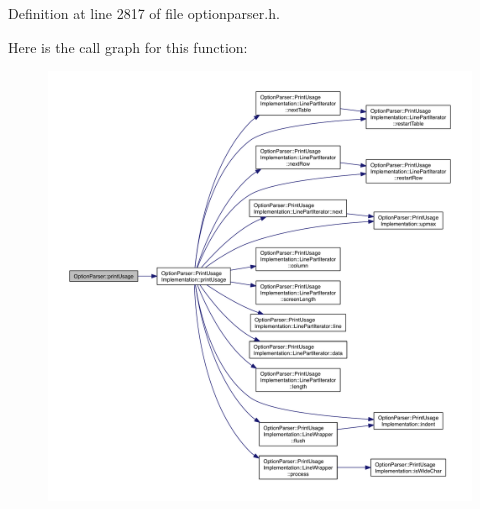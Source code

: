 Definition at line 2817 of file optionparser.\-h.



Here is the call graph for this function\-:\nopagebreak
\begin{figure}[H]
\begin{center}
\leavevmode
\includegraphics[width=350pt]{namespace_option_parser_a4dc729b794dd3528f776e41c2d2b5b3e_cgraph}
\end{center}
\end{figure}


